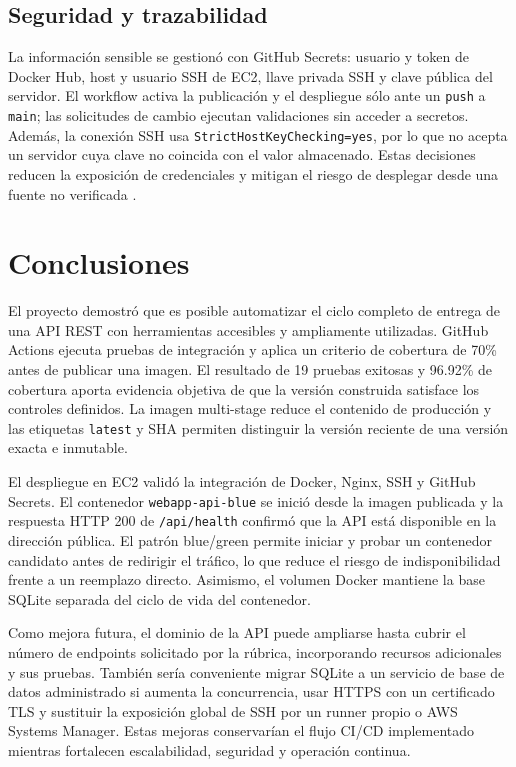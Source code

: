 \documentclass[12pt,a4paper]{report}
\begin{document}
\section{Seguridad y trazabilidad}

La información sensible se gestionó con GitHub Secrets: usuario y token de Docker Hub, host y usuario SSH de EC2, llave privada SSH y clave pública del servidor. El workflow activa la publicación y el despliegue sólo ante un \texttt{push} a \texttt{main}; las solicitudes de cambio ejecutan validaciones sin acceder a secretos. Además, la conexión SSH usa \texttt{StrictHostKeyChecking=yes}, por lo que no acepta un servidor cuya clave no coincida con el valor almacenado. Estas decisiones reducen la exposición de credenciales y mitigan el riesgo de desplegar desde una fuente no verificada \cite{githubsecrets}.

\chapter{Conclusiones}

El proyecto demostró que es posible automatizar el ciclo completo de entrega de una API REST con herramientas accesibles y ampliamente utilizadas. GitHub Actions ejecuta pruebas de integración y aplica un criterio de cobertura de 70\% antes de publicar una imagen. El resultado de 19 pruebas exitosas y 96.92\% de cobertura aporta evidencia objetiva de que la versión construida satisface los controles definidos. La imagen multi-stage reduce el contenido de producción y las etiquetas \texttt{latest} y SHA permiten distinguir la versión reciente de una versión exacta e inmutable.

El despliegue en EC2 validó la integración de Docker, Nginx, SSH y GitHub Secrets. El contenedor \texttt{webapp-api-blue} se inició desde la imagen publicada y la respuesta HTTP 200 de \texttt{/api/health} confirmó que la API está disponible en la dirección pública. El patrón blue/green permite iniciar y probar un contenedor candidato antes de redirigir el tráfico, lo que reduce el riesgo de indisponibilidad frente a un reemplazo directo. Asimismo, el volumen Docker mantiene la base SQLite separada del ciclo de vida del contenedor.

Como mejora futura, el dominio de la API puede ampliarse hasta cubrir el número de endpoints solicitado por la rúbrica, incorporando recursos adicionales y sus pruebas. También sería conveniente migrar SQLite a un servicio de base de datos administrado si aumenta la concurrencia, usar HTTPS con un certificado TLS y sustituir la exposición global de SSH por un runner propio o AWS Systems Manager. Estas mejoras conservarían el flujo CI/CD implementado mientras fortalecen escalabilidad, seguridad y operación continua.
\end{document}
